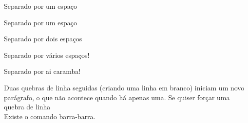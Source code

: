 Separado por
um espaço

Separado por um espaço

Separado por  dois espaços

Separado por        vários espaços!

Separado por 
                    ai caramba!

Duas quebras de linha seguidas
(criando uma linha em branco)
iniciam um novo parágrafo, o que não 
acontece quando há apenas uma.
Se quiser forçar uma quebra de linha\\
Existe o comando barra-barra.
